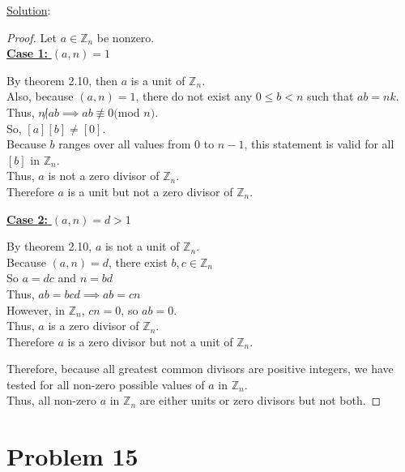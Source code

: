 \documentclass{article} %
\begin{document}
\underline{Solution}: 
\begin{addmargin}[1em]{0em}
\begin{proof}
Let $a \in \mathbb{Z}_n$ be nonzero. \\
\underline{\textbf{Case 1:} $(a,n) = 1$}
\begin{addmargin}[1em]{0em}
By theorem 2.10, then $a$ is a unit of $\mathbb{Z}_n$.
\\Also, because $(a,n) = 1$, there do not exist any $0 \leq b < n$ such that $ab = nk$.
\\Thus, $n \not| ab \implies ab \not\equiv 0 ($mod $n)$.
\\So, $[a][b] \neq [0]$.
\\Because $b$ ranges over all values from $0$ to $n-1$, this statement is valid for all $[b]$ in $\mathbb{Z}_n$.
\\Thus, $a$ is not a zero divisor of $\mathbb{Z}_n$.
\\Therefore $a$ is a unit but not a zero divisor of $\mathbb{Z}_n$.
\end{addmargin}
\underline{\textbf{Case 2:} $(a,n) = d > 1$}
\begin{addmargin}[1em]{0em}
By theorem 2.10, $a$ is not a unit of $\mathbb{Z}_n$.
\\Because $(a,n) = d$, there exist $b,c \in \mathbb{Z}_n$
\\So $a = dc$ and $n = bd$ 
\\Thus, $ab = bcd \implies ab = cn$
\\However, in $\mathbb{Z}_n$, $cn = 0$, so $ab = 0$.
\\Thus, $a$ is a zero divisor of $\mathbb{Z}_n$.
\\Therefore $a$ is a zero divisor but not a unit of $\mathbb{Z}_n$.
\end{addmargin}
Therefore, because all greatest common divisors are positive integers, we have tested for all non-zero possible values of $a$ in $\mathbb{Z}_n$.
\\Thus, all non-zero $a$ in $\mathbb{Z}_n$ are either units or zero divisors but not both.
\end{proof}
\end{addmargin}

\newpage


\section*{Problem 15}
\end{document}
